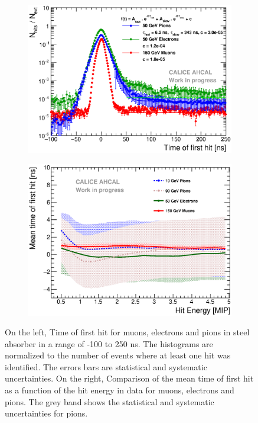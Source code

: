 \documentclass[12pt]{article}
\begin{document}
\begin{figure}[htbp!]
  \begin{subfigure}[t]{0.49\textwidth}
    \centering
    \includegraphics[width=1\textwidth]{../../Draft/fig/Timing_dNdt_Comparison_50GeVe.eps}
    \caption{} \label{fig:dNdt_Data_50GeVe}
  \end{subfigure}
  \hfill
  \begin{subfigure}[t]{0.49\textwidth}
    \centering
    \includegraphics[width=1\textwidth]{../../Draft/fig/Timing_Energy_Comparison_ShortAsymRange.eps}
    \caption{} \label{fig:Energy_Data_all}
  \end{subfigure}
  \caption{On the left, Time of first hit for muons, electrons and pions in steel absorber in a range of -100 to 250 ns. The histograms are normalized to the number of events where at least one hit was identified. The errors bars are statistical and systematic uncertainties. On the right, Comparison of the mean time of first hit as a function of the hit energy in data for muons, electrons and pions. The grey band shows the statistical and systematic uncertainties for pions.}
\end{figure}
\end{document}
